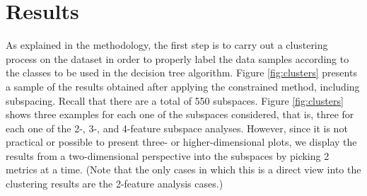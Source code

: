 
\section{Results}
\label{sec:results}

As explained in the methodology, the first step is to carry out a clustering process on the dataset in order to properly label the data samples according to the classes to be used in the decision tree algorithm. Figure \ref{fig:clusters} presents a sample of the results obtained after applying the constrained \kmeans{} method, including subspacing. Recall that there are a total of 550 subspaces. Figure \ref{fig:clusters} shows three examples for each one of the subspaces considered, that is, three for each one of the 2-, 3-, and 4-feature subspace analyses. However, since it is not practical or possible to present three- or higher-dimensional plots, we display the results from a two-dimensional perspective into the subspaces by picking 2 metrics at a time. (Note that the only cases in which this is a direct view into the clustering results are the 2-feature analysis cases.)

